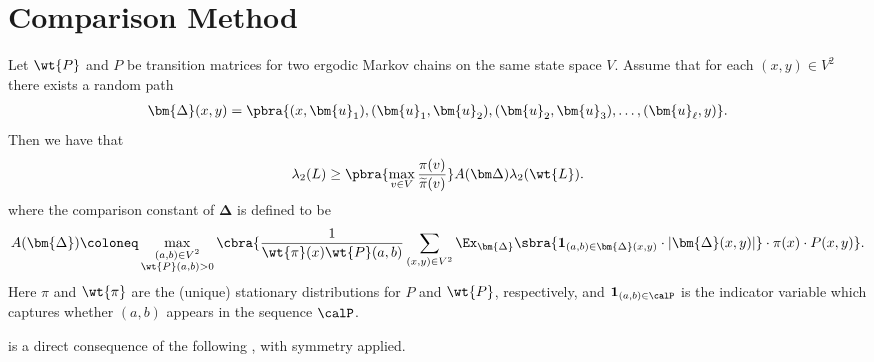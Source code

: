 \section{Comparison Method}\label{appendix:comparison}


\begin{theorem}
    \label{thm:wilmer comparison}
    Let $\wt{P}$ and $P$ be transition matrices for two ergodic Markov chains on the same state space $V$. Assume that for each $(x,y)\in V^2$ there exists a random path 
    \begin{align*}
        \bm{\Delta}(x,y)=\pbra{(x,\bm{u}_1),(\bm{u}_1,\bm{u}_2),(\bm{u}_2,\bm{u}_3),\dots,(\bm{u}_{\ell},y)}.
    \end{align*}
    Then we have that
    \begin{align*}
        \lambda_2(L)\geq \pbra{\max_{v\in V}\frac{\pi(v)}{\widetilde{\pi}(v)}}A(\bm\Delta)\lambda_2(\wt{L}).
    \end{align*}
    where the comparison constant of $\bm{\Delta}$ is defined to be
    \begin{align*}
        A(\bm{\Delta}) \coloneq \max_{\substack{(a,b)\in V^2 \\\wt{P}(a,b)>0}} \cbra{\frac{1}{\wt{\pi}(x)\wt{P}(a,b)}\sum_{(x,y)\in V^2}\Ex_{\bm{\Delta}}\sbra{\mathbf{1}_{(a, b) \in \bm{\Delta}(x,y)}\cdot |\bm{\Delta}(x,y)|}\cdot  \pi(x)\cdot P(x, y)}.
    \end{align*}
    Here $\pi$ and $\wt{\pi}$ are the (unique) stationary distributions for $P$ and $\wt{P}$, respectively, and $\mathbf{1}_{(a, b) \in \calP}$ is the indicator variable which captures whether $(a,b)$ appears in the sequence $\calP$.
\end{theorem}

 is a direct consequence of the following , with symmetry applied.

